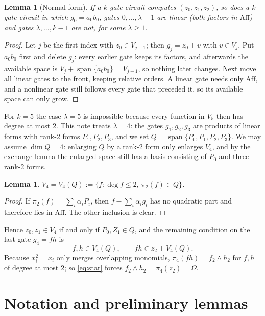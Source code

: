 \documentclass[11pt,a4paper]{article}
\theoremstyle{plain}
\newtheorem{lemma}[theorem]{Lemma}
\theoremstyle{definition}
\theoremstyle{remark}
\newcommand{\Aff}{\mathrm{Aff}}
\newcommand{\Span}{\operatorname{span}}
\begin{document}
\begin{lemma}[Normal form]\label{lem:normal}
If a $k$-gate circuit computes $(z_0,z_1,z_2)$, so does a $k$-gate circuit in which $g_0=a_0b_0$, gates $0,\dots,\lambda-1$ are linear (both factors in $\Aff$) and gates $\lambda,\dots,k-1$ are not, for some $\lambda\ge1$.
\end{lemma}

\begin{proof}
Let $j$ be the first index with $z_0\in V_{j+1}$; then $g_j=z_0+v$ with $v\in V_j$. Put $a_0b_0$ first and delete $g_j$: every earlier gate keeps its factors, and afterwards the available space is $V_j+\Span\{a_0b_0\}=V_{j+1}$, so nothing later changes. Next move all linear gates to the front, keeping relative orders. A linear gate needs only $\Aff$, and a nonlinear gate still follows every gate that preceded it, so its available space can only grow.
\end{proof}

For $k=5$ the case $\lambda=5$ is impossible because every function in $V_5$ then has degree at most $2$. This note treats $\lambda=4$: the gates $g_1,g_2,g_3$ are products of linear forms with rank-2 forms $P_1,P_2,P_3$, and we set $Q=\Span\{P_0,P_1,P_2,P_3\}$. We may assume $\dim Q=4$: enlarging $Q$ by a rank-2 form only enlarges $V_4$, and by the exchange lemma the enlarged space still has a basis consisting of $P_0$ and three rank-2 forms.

\begin{lemma}\label{lem:Qonly}
$V_4=V_4(Q):=\{f:\deg f\le 2,\ \pi_2(f)\in Q\}$.
\end{lemma}

\begin{proof}
If $\pi_2(f)=\sum_i\alpha_iP_i$, then $f-\sum_i\alpha_ig_i$ has no quadratic part and therefore lies in $\Aff$. The other inclusion is clear.
\end{proof}

Hence $z_0,z_1\in V_4$ if and only if $P_0,Z_1\in Q$, and the remaining condition on the last gate $g_4=fh$ is
\begin{equation}\label{eq:star}
  f,h\in V_4(Q),\qquad fh\in z_2+V_4(Q).
\end{equation}
Because $x_i^2=x_i$ only merges overlapping monomials, $\pi_4(fh)=f_2\wedge h_2$ for $f,h$ of degree at most $2$; so \eqref{eq:star} forces $f_2\wedge h_2=\pi_4(z_2)=\Omega$.

\section{Notation and preliminary lemmas}
\end{document}
